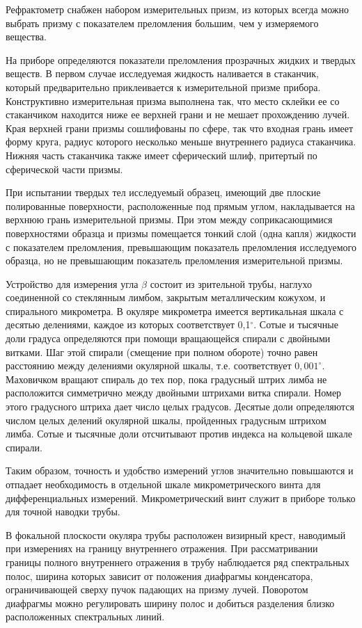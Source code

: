 Рефрактометр снабжен
набором измерительных призм, из которых всегда можно выбрать
призму с показателем преломления большим, чем у измеряемого
вещества.

На приборе определяются показатели преломления прозрачных жидких и
твердых веществ. В первом случае исследуемая жидкость наливается в
стаканчик, который предварительно приклеивается к измерительной
призме прибора. Конструктивно измерительная призма выполнена так,
что место склейки ее со стаканчиком находится ниже ее верхней
грани и не мешает прохождению лучей. Края верхней грани призмы
сошлифованы по сфере, так что входная грань имеет форму круга,
радиус которого несколько меньше внутреннего радиуса стаканчика.
Нижняя часть стаканчика также имеет сферический шлиф, притертый по
сферической части призмы.

При испытании твердых тел исследуемый образец, имеющий две плоские
полированные поверхности, расположенные под прямым углом,
накладывается на верхнюю грань измерительной призмы. При этом
между соприкасающимися поверхностями образца и призмы помещается
тонкий слой (одна капля) жидкости с показателем преломления,
превышающим показатель преломления исследуемого образца, но не
превышающим показатель преломления измерительной призмы.

Устройство для измерения угла $\beta$ состоит из зрительной трубы,
наглухо соединенной со стеклянным лимбом, закрытым металлическим
кожухом, и спирального микрометра. В окуляре микрометра имеется
вертикальная шкала с десятью делениями, каждое из которых
соответствует 0,1$^{\circ}$. Сотые и тысячные доли градуса
определяются при помощи вращающейся спирали с двойными витками.
Шаг этой спирали (смещение при полном обороте) точно равен
расстоянию между делениями окулярной шкалы, т.е. соответствует
$0,001^{\circ}$. Маховичком вращают спираль до тех пор, пока
градусный штрих лимба не расположится симметрично между двойными
штрихами витка спирали. Номер этого градусного штриха дает число
целых градусов. Десятые доли определяются числом целых делений
окулярной шкалы, пройденных градусным штрихом лимба. Сотые и
тысячные доли отсчитывают против индекса на кольцевой шкале
спирали.

Таким образом, точность и удобство измерений углов значительно
повышаются и отпадает необходимость в отдельной шкале
микрометрического винта для дифференциальных измерений.
Микрометрический винт служит в приборе только для точной наводки
трубы.

В фокальной плоскости окуляра трубы расположен визирный крест,
наводимый при измерениях на границу внутреннего отражения. При
рассматривании границы полного внутреннего отражения в трубу
наблюдается ряд спектральных полос, ширина которых зависит от
положения диафрагмы конденсатора, ограничивающей сверху пучок
падающих на призму лучей. Поворотом диафрагмы можно регулировать
ширину полос и добиться разделения близко расположенных
спектральных линий.

